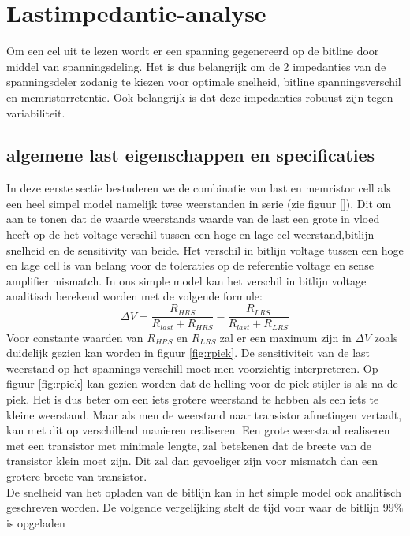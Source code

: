 \chapter{Lastimpedantie-analyse}
\label{loadanalysis}
Om een cel uit te lezen wordt er een spanning gegenereerd op de bitline door middel van spanningsdeling.
Het is dus belangrijk om de 2 impedanties van de spanningsdeler zodanig te kiezen voor optimale snelheid, bitline spanningsverschil en memristorretentie.
Ook belangrijk is dat deze impedanties robuust zijn tegen variabiliteit.

\section{algemene last eigenschappen en specificaties}\label{sec:simplemodel}
In deze eerste sectie bestuderen we de combinatie van last en memristor cell als een heel simpel model namelijk twee weerstanden in serie (zie figuur \ref{}). Dit om aan te tonen dat de waarde weerstands waarde van de last een grote in vloed heeft op de het voltage verschil tussen een hoge en lage cel weerstand,bitlijn snelheid en de sensitivity van beide.
Het verschil in bitlijn voltage tussen een hoge en lage cell is van belang voor de toleraties op de referentie voltage en sense amplifier mismatch. In ons simple model kan het verschil in bitlijn voltage analitisch berekend worden met de volgende formule:
\begin{equation}
 \Delta V = \frac{R_{HRS}}{R_{last}+R_{HRS}} - \frac{R_{LRS}}{R_{last}+R_{LRS}}
\end{equation} 
Voor constante waarden van $R_{HRS}$ en $R_{LRS}$ zal er een maximum zijn in $ \Delta V$ zoals duidelijk gezien kan worden in figuur \ref{fig:rpiek}. De sensitiviteit van de last weerstand op het spannings verschill moet men voorzichtig interpreteren. Op figuur \ref{fig:rpiek} kan gezien worden dat de helling voor de piek stijler is als na de piek. Het is dus beter om een iets grotere weerstand te hebben als een iets te kleine weerstand. Maar als men de weerstand naar transistor afmetingen vertaalt, kan met dit op verschillend manieren realiseren. Een grote weerstand realiseren met een transistor met minimale lengte, zal betekenen dat de breete van de transistor klein moet zijn. Dit zal dan gevoeliger zijn voor mismatch dan een grotere breete van transistor.\\
De snelheid van het opladen van de bitlijn kan in het simple model ook analitisch geschreven worden. De volgende vergelijking stelt de tijd voor waar de bitlijn $99\%$ is opgeladen

